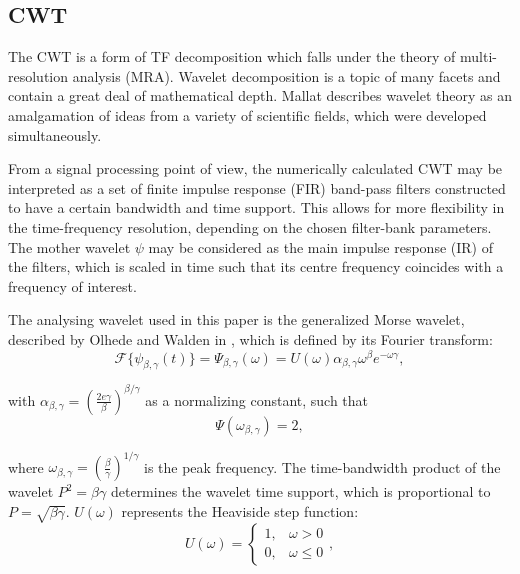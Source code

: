 

\subsection{CWT}
The CWT is a form of TF decomposition which falls under the theory of multi-resolution analysis (MRA). Wavelet decomposition is a topic of many facets and contain a great deal of mathematical depth. Mallat \citep{waveletbook} describes wavelet theory as an amalgamation of ideas from a variety of scientific fields, which were developed simultaneously.
 
From a signal processing point of view, the numerically calculated CWT may be interpreted as a set of finite impulse response (FIR) band-pass filters constructed to have a certain bandwidth and time support. This allows for more flexibility in the time-frequency resolution, depending on the chosen filter-bank parameters. The mother wavelet $\psi$ may be considered as the main impulse response (IR) of the filters, which is scaled in time such that its centre frequency coincides with a frequency of interest.

The analysing wavelet used in this paper is the generalized Morse wavelet, described by Olhede and Walden in \citep{morsewavelets, morsewavelets2}, which is defined by its Fourier transform:
\begin{equation*}
	\mathcal{F}\{\psi_{\beta, \gamma} (t) \} = \Psi_{\beta, \gamma}(\omega) = U(\omega) \alpha_{\beta, \gamma} \omega ^ \beta e^{-\omega \gamma},
\end{equation*}

\noindent with $\alpha_{\beta, \gamma} = (\frac{2e \gamma}{\beta})^{\beta/\gamma}$ as a normalizing constant, such that 
\begin{equation}
	\label{eqn:cwt:bpmag}
\Psi(\omega_{\beta,\gamma}) = 2,
\end{equation}

\noindent where $\omega_{\beta,\gamma} = (\frac{\beta}{\gamma})^{1/\gamma}$ is the peak frequency. The time-bandwidth product of the wavelet $P^2 = \beta \gamma$ determines the wavelet time support, which is proportional to $P = \sqrt{\beta\gamma}$. $U(\omega)$ represents the Heaviside step function:
\begin{equation*}
	U(\omega) = \begin{cases}
		1, & \omega > 0 \\
		0, & \omega \le 0
	\end{cases},
\end{equation*}

